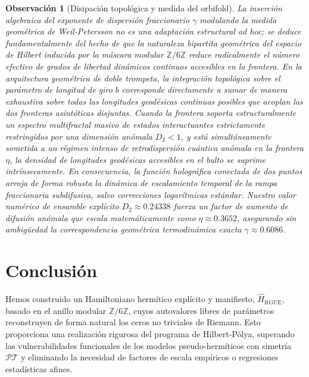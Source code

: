 \documentclass[aps,prl,preprint,superscriptaddress,floatfix]{revtex4-2}
\newtheorem{remark}[theorem]{Observación}
\newcommand{\Zmod}{\mathbb{Z}/6\mathbb{Z}}
\begin{document}
\begin{remark}[Disipación topológica y medida del orbifold]
La inserción algebraica del exponente de dispersión fraccionario $\gamma$ modulando la medida geométrica de Weil-Petersson no es una adaptación estructural ad hoc; se deduce fundamentalmente del hecho de que la naturaleza bipartita geométrica del espacio de Hilbert inducida por la máscara modular $\Zmod$ reduce radicalmente el número efectivo de grados de libertad dinámicos continuos accesibles en la frontera. En la arquitectura geométrica de doble trompeta, la integración topológica sobre el parámetro de longitud de giro $b$ corresponde directamente a sumar de manera exhaustiva sobre todas las longitudes geodésicas continuas posibles que acoplan las dos fronteras asintóticas disjuntas. Cuando la frontera soporta estructuralmente un espectro multifractal masivo de estados interactuantes estrictamente restringidos por una dimensión anómala $D_2<1$, y está simultáneamente sometida a un régimen intenso de retrodispersión cuántica anómala en la frontera $\eta$, la densidad de longitudes geodésicas accesibles en el bulto se suprime intrínsecamente. En consecuencia, la función holográfica conectada de dos puntos arroja de forma robusta la dinámica de escalamiento temporal de la rampa fraccionaria subdifusiva, salvo correcciones logarítmicas estándar. Nuestro valor numérico de ensamble explícito $D_2\approx 0.24338$ fuerza un factor de aumento de difusión anómala que escala matemáticamente como $\eta \approx 0.3652$, asegurando sin ambigüedad la correspondencia geométrica termodinámica exacta $\gamma \approx 0.6086$.
\end{remark}

\section{Conclusión}

Hemos construido un Hamiltoniano hermítico explícito y manifiesto, $\hat{H}_{\text{RGUE}}$, basado en el anillo modular $\mathbb{Z}/6\mathbb{Z}$, cuyos autovalores libres de parámetros reconstruyen de forma natural los ceros no triviales de Riemann. Esto proporciona una realización rigurosa del programa de Hilbert-Pólya, superando las vulnerabilidades funcionales de los modelos pseudo-hermíticos con simetría $\mathcal{PT}$ y eliminando la necesidad de factores de escala empíricos o regresiones estadísticas afines.
\end{document}
